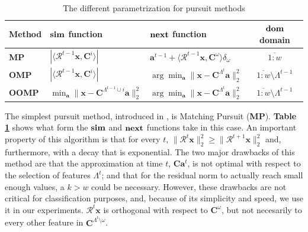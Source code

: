 \documentclass[12pt,a4paper,oneside,english]{UPBThesis}
\newcommand{\hcrange}[2]{\overline{{#1}\colon\!\!{#2}}}
\begin{document}
\renewcommand{\arraystretch}{1.5}
\begin{table}
  \caption{The different parametrization for pursuit methods}
  \label{table:PursuitParametrization}
  \begin{tabularx}{\textwidth}{|l|>{\centering}X|>{\centering}X|c|}
       \hline
        Method & $\text{\textbf{sim}}$ function & $\text{\textbf{next}}$ function & $\text{\textbf{dom}}$ domain\\ \hline \hline
        \textbf{MP} & $\left| \langle \mathcal{R}^{t-1}\textbf{x} , \textbf{C}^i \rangle \right|$ & $\textbf{a}^{t-1} + \langle \mathcal{R}^{t-1}\textbf{x} , \textbf{C}^\omega \rangle \delta_\omega$ & $\hcrange{1}{w}$ \\  \hline
        \textbf{OMP} & $\left| \langle \mathcal{R}^{t-1}\textbf{x} , \textbf{C}^i \rangle \right|$ & $\arg\min_{\textbf{a}} {\| \textbf{x} - \textbf{C}^{\Lambda^t}\textbf{a} \|_2^2}$ & $\hcrange{1}{w} \setminus \Lambda^{t-1}$ \\ \hline
        \textbf{OOMP} & $\min_{\textbf{a}} {\| \textbf{x} - \textbf{C}^{\Lambda^{t-1} \cup i}\textbf{a} \|_2^2}$ & $\arg\min_{\textbf{a}} {\| \textbf{x} - \textbf{C}^{\Lambda^t}\textbf{a} \|_2^2}$ & $\hcrange{1}{w} \setminus \Lambda^{t-1}$ \\
       \hline
    \end{tabularx}
\end{table}
\renewcommand{\arraystretch}{1.0}

The simplest pursuit method, introduced in \cite{matchingpursuit1}, is Matching Pursuit (\textbf{MP}). \textbf{Table \ref{table:PursuitParametrization}} shows what form the $\text{\textbf{sim}}$ and $\text{\textbf{next}}$ functions take in this case. An important property of this algorithm is that for every $t$, $\|\mathcal{R}^t\textbf{x}\|_2^2 \geq \|\mathcal{R}^{t+1}\textbf{x}\|_2^2$ and, furthermore, with a decay that is exponential. The two major drawbacks of this method are that the approximation at time $t$, $\textbf{C}\textbf{a}^t$, is not optimal with respect to the selection of features $\Lambda^t$; and that for the residual norm to actually reach small enough values, a $k > w$ could be necessary. However, these drawbacks are not critical for classification purposes, and, because of its simplicity and speed, we use it in our experiments. $\mathcal{R}^t\textbf{x}$ is orthogonal with respect to $\textbf{C}^\omega$, but not necesarily to every other feature in $\textbf{C}^{\Lambda^t \setminus \omega}$.
\end{document}
